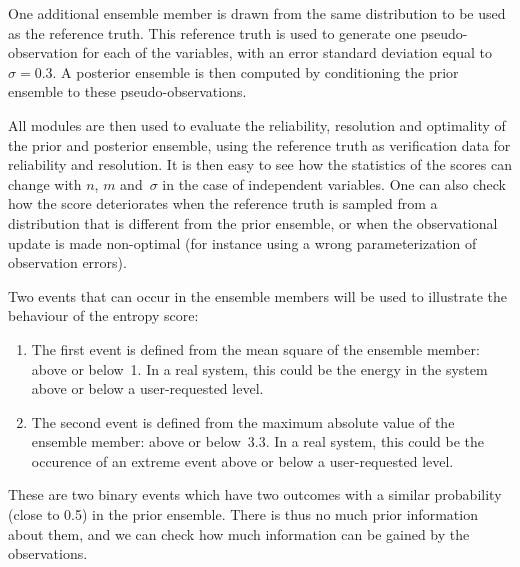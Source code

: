 \documentclass[11pt]{article}
\begin{document}
One additional ensemble member is drawn from the same distribution
to be used as the reference truth.
This reference truth is used to generate one pseudo-observation
for each of the variables, with an error standard deviation equal to~$\sigma=0.3$.
A posterior ensemble is then computed by conditioning the prior ensemble
to these pseudo-observations.

All modules are then used to evaluate the reliability, resolution
and optimality of the prior and posterior ensemble,
using the reference truth as verification data for reliability and resolution.
It is then easy to see how the statistics of the scores
can change with $n$, $m$ and~$\sigma$ in the case of independent variables.
One can also check how the score deteriorates
when the reference truth is sampled from a distribution
that is different from the prior ensemble, or
when the observational update is made non-optimal
(for instance using a wrong parameterization of observation errors).

Two events that can occur in the ensemble members
will be used to illustrate the behaviour of the entropy score:

\begin{enumerate}
\item The first event is defined from the mean square of the ensemble member: above or below~1.
In a real system, this could be the energy in the system above or below a user-requested level.
\item The second event is defined from the maximum absolute value of the ensemble member: above or below~3.3.
In a real system, this could be the occurence of an extreme event above or below a user-requested level.
\end{enumerate}

\noindent
These are two binary events which have two outcomes
with a similar probability (close to 0.5) in the prior ensemble.
There is thus no much prior information about them,
and we can check how much information
can be gained by the observations.
\end{document}
